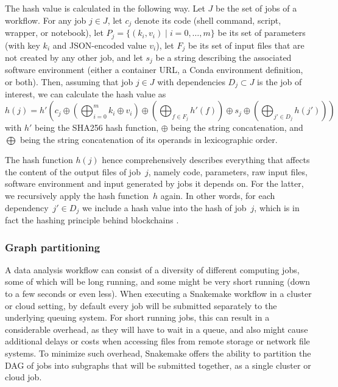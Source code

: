 \documentclass[parskip=half]{scrartcl}
\begin{document}
The hash value is calculated in the following way.
Let $J$ be the set of jobs of a workflow.
For any job $j \in J$, let $c_j$ denote its code (shell command, script, wrapper, or notebook), let $P_j = \{(k_i, v_i) \mid i=0,\dots,m\}$ be its set of parameters (with key $k_i$ and JSON-encoded value $v_i$), let $F_j$ be its set of input files that are not created by any other job, and let $s_j$ be a string describing the associated software environment (either a container URL, a Conda environment definition, or both).
Then, assuming that job $j \in J$ with dependencies $D_j \subset J$ is the job of interest, we can calculate the hash value as $$ h(j) = h'\left( c_j \oplus \left(\bigoplus_{i=0}^m k_i \oplus v_i \right) \oplus \left( \bigoplus_{f \in F_j} h'(f) \right) \oplus s_j \oplus \left( \bigoplus_{j' \in D_j} h(j') \right) \right) $$ with $h'$ being the SHA256 \parencite{Handschuh} hash function, $\oplus$ being the string concatenation, and $\bigoplus$ being the string concatenation of its operands in lexicographic order.

The hash function $h(j)$ hence comprehensively describes everything that affects the content of the output files of job~\(j\), namely code, parameters, raw input files, software environment and input generated by jobs it depends on.
For the latter, we recursively apply the hash function~\(h\) again.
In other words, for each dependency~\(j' \in D_j\) we include a hash value into the hash of job~\(j\), which is in fact the hashing principle behind blockchains \parencite{narayanan_bitcoin_2016}.

\subsubsection{Graph partitioning}\label{sec:partitioning}

A data analysis workflow can consist of a diversity of different computing jobs, some of which will be long running, and some might be very short running (down to a few seconds or even less).
When executing a Snakemake workflow in a cluster or cloud setting, by default every job will be submitted separately to the underlying queuing system.
For short running jobs, this can result in a considerable overhead, as they will have to wait in a queue, and also might cause additional delays or costs when accessing files from remote storage or network file systems.
To minimize such overhead, Snakemake offers the ability to partition the DAG of jobs into subgraphs that will be submitted together, as a single cluster or cloud job.
\end{document}
